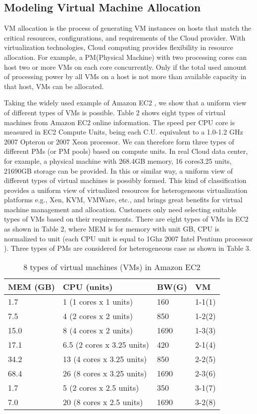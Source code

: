 \documentclass[3p, twocolumn]{elsarticle}
\begin{document}
\subsection{Modeling Virtual Machine Allocation}
VM allocation is the process of generating VM instances on hosts that match the critical resources, configurations, and requirements of the Cloud provider. With virtualization technologies, Cloud computing provides flexibility in resource allocation. For example, a PM(Physical Machine) with two processing cores can host two or more VMs on each core concurrently. Only if the total used amount of processing power by all VMs on a host is not more than available capacity in that host, VMs can be allocated.

Taking the widely used example of Amazon EC2 \cite{IEEEhowto:Amazon}, we show that a uniform view of different types of VMs is possible. Table 2 shows eight types of virtual machines from Amazon EC2 online information. The speed per CPU core is measured in EC2 Compute Units, being each C.U. equivalent to a 1.0-1.2 GHz 2007 Opteron or 2007 Xeon processor. We can therefore form three types of different PMs (or PM pools) based on compute units. In real Cloud data center, for example, a physical machine with 268.4GB memory, 16 cores3.25 units, 21690GB storage can be provided. In this or similar way, a uniform view of different types of virtual machines is possibly formed. This kind of classification provides a uniform view of virtualized resources for heterogeneous virtualization platforms e.g., Xen, KVM, VMWare, etc., and brings great benefits for virtual machine management and allocation. Customers only need selecting suitable types of VMs based on their requirements. There are eight types of VMs in EC2 as shown in Table 2, where MEM is for memory with unit GB, CPU is normalized to unit (each CPU unit is equal to 1Ghz 2007 Intel Pentium processor \cite{IEEEhowto:Amazon}). Three types of PMs are considered for heterogeneous case as shown in Table 3.
\begin{table}
\footnotesize
\caption{8 types of virtual machines (VMs) in Amazon EC2
}
\begin{center}
\begin{tabular}{|l|l|l||l|}
\hline MEM (GB) & CPU (units)& BW(G)&VM
\\\hline
\hline 1.7 & 1 (1 cores x 1 units)& 160& 1-1(1) \\
\hline 7.5 &4 (2 cores x 2 units) & 850& 1-2(2) \\
\hline 15.0& 8 (4 cores x 2 units) &1690&1-3(3) \\
\hline 17.1& 6.5 (2 cores x 3.25 units) &420&2-1(4)\\
\hline 34.2& 13 (4 cores x 3.25 units) &850&2-2(5)\\
\hline 68.4& 26 (8 cores x 3.25 units) &1690&2-3(6)\\
\hline 1.7& 5 (2 cores x 2.5 units) &350&3-1(7) \\
\hline 7.0& 20 (8 cores x 2.5 units) &1690&3-2(8)\\
\hline
\end{tabular} \\
\end{center}
\end{table}
\end{document}
